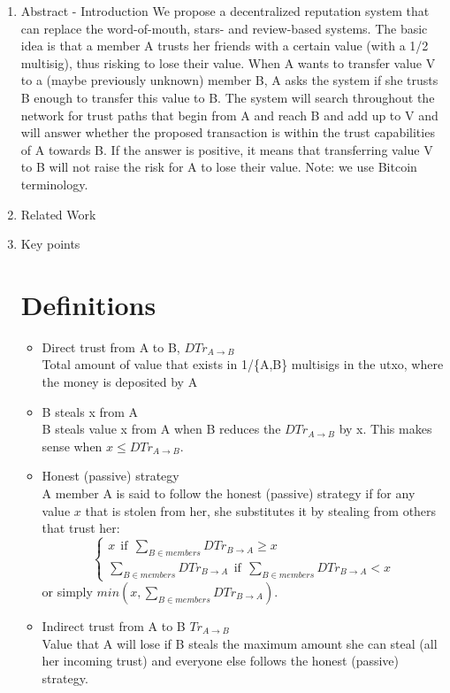 \documentclass[11pt]{article}
\begin{document}
\begin{enumerate}
  \item Abstract - Introduction
  We propose a decentralized reputation system that can replace the word-of-mouth, stars- and review-based systems.
  The basic idea is that a member A trusts her friends with a certain value (with a 1/2 multisig), thus
  risking to lose their value. When A wants to transfer value V to a (maybe previously unknown) member B,
  A asks the system if she trusts B enough to transfer this value to B. The system will search throughout
  the network for trust paths that begin from A and reach B and add up to V and will answer whether the
  proposed transaction is within the trust capabilities of A towards B. If the answer is positive, it means
  that transferring value V to B will not raise the risk for A to lose their value.
  Note: we use Bitcoin terminology.


  \item Related Work

  \item Key points
  \section*{Definitions}
    \begin{itemize}
      \item Direct trust from A to B, $DTr_{A \rightarrow B}$ \\
      Total amount of value that exists in 1/\{A,B\} multisigs in the utxo, where the money is deposited by A
      \item B steals x from A \\
      B steals value x from A when B reduces the $DTr_{A \rightarrow B}$ by x. This makes sense when 
      $x \leq DTr_{A \rightarrow B}$.
      \item Honest (passive) strategy \\
      A member A is said to follow the honest (passive) strategy if for any value $x$ that is stolen from her, she
      substitutes it by stealing from others that trust her:
      \begin{equation*}\begin{cases}
          x\:\: \text{if} \:\:\sum_{B \in members}{DTr_{B \rightarrow A}} \geq x \\
         \sum_{B \in members}{DTr_{B \rightarrow A}}\:\: \text{if} \:\:\sum_{B \in members}{DTr_{B \rightarrow A}} < x
      \end{cases}\end{equation*}
      or simply $min(x,\sum_{B \in members}{DTr_{B \rightarrow A}})$.
      \item Indirect trust from A to B $Tr_{A \rightarrow B}$ \\
      Value that A will lose if B steals the maximum amount she can steal (all her incoming trust) and everyone
      else follows the honest (passive) strategy.
    \end{itemize}

\end{enumerate}
\end{document}
